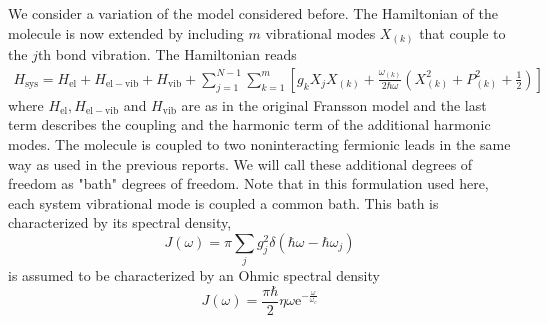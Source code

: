 \documentclass{article}
\newcommand{\exP}[1]{\mathrm{e}^{#1}}
\begin{document}
We consider a variation of the model considered before. The Hamiltonian of the molecule is now extended by including $m$ vibrational modes $X_{(k)}$ that couple to the $j$th bond vibration. The Hamiltonian reads
\begin{align*}
	H_\mathrm{sys} = H_\mathrm{el} + H_\mathrm{el-vib} + H_\mathrm{vib} + \sum_{j=1}^{N-1}\sum_{k=1}^m \left[ g_{k} X_j X_{(k)} + \frac{\omega_{(k)}}{2\hbar \omega} \left(X_{(k)}^2 + P_{(k)}^2 + \frac{1}{2}\right) \right]
\end{align*}
where $H_\mathrm{el},H_\mathrm{el-vib}$ and $H_\mathrm{vib}$ are as in the original Fransson model and the last term describes the coupling and the harmonic term of the additional harmonic modes. The molecule is coupled to two noninteracting fermionic leads in the same way as used in the previous reports.
We will call these additional degrees of freedom as "bath" degrees of freedom. Note that in this formulation used here, each system vibrational mode is coupled a common bath. This bath is characterized by its spectral density, 
\begin{equation*}
	J(\omega) = \pi\sum_j g_j^2 \delta(\hbar \omega-\hbar \omega_j) 
\end{equation*}
is assumed to be characterized by an Ohmic spectral density
\begin{equation*}
	J(\omega) = \frac{\pi\hbar}{2}\eta\omega \exP{-\frac{\omega}{\omega_c}}
\end{equation*}
\end{document}
